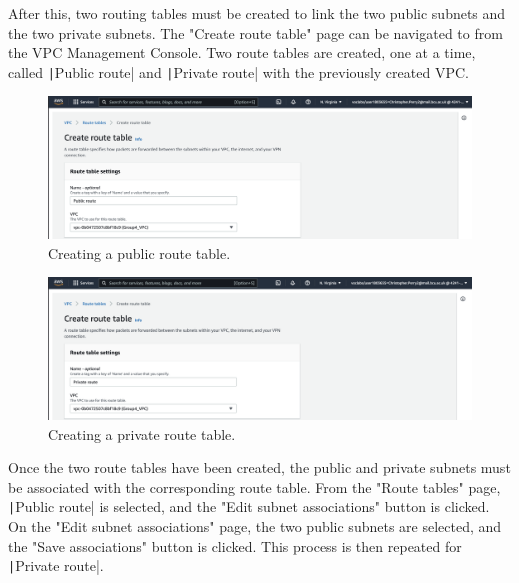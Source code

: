 After this, two routing tables must be created to link the two public subnets and the two private subnets.
The "Create route table" page can be navigated to from the VPC Management Console.
Two route tables are created, one at a time, called \texttt|Public route| and \texttt|Private route|
with the previously created VPC\@.

\begin{figure}[!htbp]
    \centering
    \includegraphics[width=\textwidth]{resources/vpc/routes/vpc-public-route}
    \caption{Creating a public route table.}
    \label{fig:vpc-public-route}
\end{figure}

\begin{figure}[!htbp]
    \centering
    \includegraphics[width=\textwidth]{resources/vpc/routes/vpc-private-route}
    \caption{Creating a private route table.}
    \label{fig:vpc-private-route}
\end{figure}

Once the two route tables have been created, the public and private subnets must be associated with the corresponding
route table.
From the "Route tables" page, \texttt|Public route| is selected, and the "Edit subnet associations" button is
clicked.
On the "Edit subnet associations" page, the two public subnets are selected, and the "Save associations" button is
clicked.
This process is then repeated for \texttt|Private route|.

